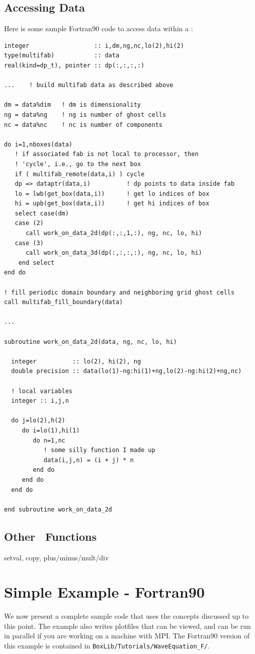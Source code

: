 \subsection{Accessing Data}
Here is some sample Fortran90 code to access data within a \MultiFab:
\begin{lstlisting}[language={[gnu]make},mathescape=false]
integer                  :: i,dm,ng,nc,lo(2),hi(2)
type(multifab)           :: data
real(kind=dp_t), pointer :: dp(:,:,:,:)

...    ! build multifab data as described above

dm = data%dim   ! dm is dimensionality
ng = data%ng    ! ng is number of ghost cells
nc = data%nc    ! nc is number of components

do i=1,nboxes(data)
   ! if associated fab is not local to processor, then
   ! 'cycle', i.e., go to the next box
   if ( multifab_remote(data,i) ) cycle
   dp => dataptr(data,i)          ! dp points to data inside fab
   lo = lwb(get_box(data,i))      ! get lo indices of box
   hi = upb(get_box(data,i))      ! get hi indices of box
   select case(dm)
   case (2)
      call work_on_data_2d(dp(:,:,1,:), ng, nc, lo, hi)
   case (3)
      call work_on_data_3d(dp(:,:,:,:), ng, nc, lo, hi)
    end select
end do

! fill periodic domain boundary and neighboring grid ghost cells
call multifab_fill_boundary(data)  

...

subroutine work_on_data_2d(data, ng, nc, lo, hi)

  integer          :: lo(2), hi(2), ng
  double precision :: data(lo(1)-ng:hi(1)+ng,lo(2)-ng:hi(2)+ng,nc)

  ! local variables
  integer :: i,j,n

  do j=lo(2),h(2)
     do i=lo(1),hi(1)
        do n=1,nc
           ! some silly function I made up
           data(i,j,n) = (i + j) * n
        end do
     end do
  end do

end subroutine work_on_data_2d
\end{lstlisting}

\subsection{Other \MultiFab\ Functions}
setval, copy, plus/minus/mult/div

\section{Simple Example - Fortran90}
We now present a complete sample code that uses the concepts discussed up to this point.
The example also writes plotfiles that can be viewed, and can be run in parallel if you
are working on a machine with MPI.  The Fortran90 version of this example is contained in 
{\tt BoxLib/Tutorials/WaveEquation\_F/}.

